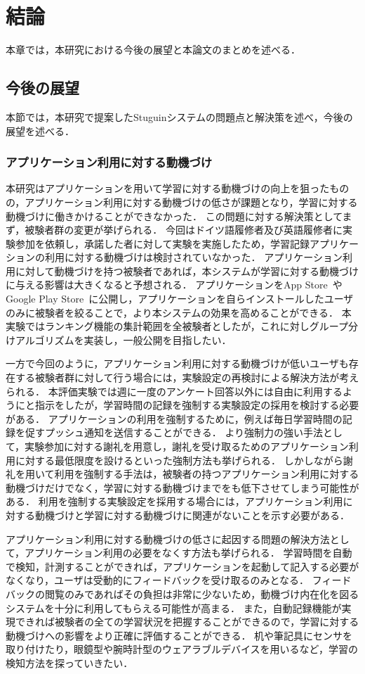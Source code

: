 \chapter{結論}
本章では，本研究における今後の展望と本論文のまとめを述べる．

\section{今後の展望}
本節では，本研究で提案したStuguinシステムの問題点と解決策を述べ，今後の展望を述べる．

\subsection{アプリケーション利用に対する動機づけ}
本研究はアプリケーションを用いて学習に対する動機づけの向上を狙ったものの，アプリケーション利用に対する動機づけの低さが課題となり，学習に対する動機づけに働きかけることができなかった．
この問題に対する解決策としてまず，被験者群の変更が挙げられる．
今回はドイツ語履修者及び英語履修者に実験参加を依頼し，承諾した者に対して実験を実施したため，学習記録アプリケーションの利用に対する動機づけは検討されていなかった．
アプリケーション利用に対して動機づけを持つ被験者であれば，本システムが学習に対する動機づけに与える影響は大きくなると予想される．
アプリケーションをApp Store~\cite{appStore}やGoogle Play Store~\cite{googlePlay}に公開し，アプリケーションを自らインストールしたユーザのみに被験者を絞ることで，より本システムの効果を高めることができる．
本実験ではランキング機能の集計範囲を全被験者としたが，これに対しグループ分けアルゴリズムを実装し，一般公開を目指したい．

一方で今回のように，アプリケーション利用に対する動機づけが低いユーザも存在する被験者群に対して行う場合には，実験設定の再検討による解決方法が考えられる．
本評価実験では週に一度のアンケート回答以外には自由に利用するようにと指示をしたが，学習時間の記録を強制する実験設定の採用を検討する必要がある．
アプリケーションの利用を強制するために，例えば毎日学習時間の記録を促すプッシュ通知を送信することができる．
より強制力の強い手法として，実験参加に対する謝礼を用意し，謝礼を受け取るためのアプリケーション利用に対する最低限度を設けるといった強制方法も挙げられる．
しかしながら謝礼を用いて利用を強制する手法は，被験者の持つアプリケーション利用に対する動機づけだけでなく，学習に対する動機づけまでをも低下させてしまう可能性がある．
利用を強制する実験設定を採用する場合には，アプリケーション利用に対する動機づけと学習に対する動機づけに関連がないことを示す必要がある．

アプリケーション利用に対する動機づけの低さに起因する問題の解決方法として，アプリケーション利用の必要をなくす方法も挙げられる．
学習時間を自動で検知，計測することができれば，アプリケーションを起動して記入する必要がなくなり，ユーザは受動的にフィードバックを受け取るのみとなる．
フィードバックの閲覧のみであればその負担は非常に少ないため，動機づけ内在化を図るシステムを十分に利用してもらえる可能性が高まる．
また，自動記録機能が実現できれば被験者の全ての学習状況を把握することができるので，学習に対する動機づけへの影響をより正確に評価することができる．
机や筆記具にセンサを取り付けたり，眼鏡型や腕時計型のウェアラブルデバイスを用いるなど，学習の検知方法を探っていきたい．

